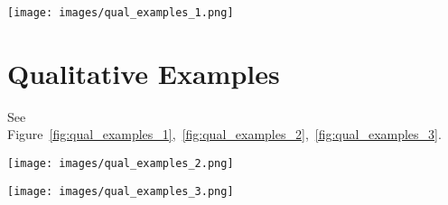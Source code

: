 \documentclass[11pt]{article}
\begin{document}
\begin{figure*}[!t]
\centering
    \texttt{[image: images/qual\_examples\_1.png]}
    \captionsetup{justification=centering}
    \caption[model]{Qualitative Examples Using Different Sampling Strategies.}
    \label{fig:qual_examples_1}
\end{figure*}


\newpage

\section{Qualitative Examples}

See Figure~\ref{fig:qual_examples_1},~\ref{fig:qual_examples_2},~\ref{fig:qual_examples_3}.
\begin{figure*}[!t]
\centering
    \texttt{[image: images/qual\_examples\_2.png]}
\caption[model]{Qualitative Examples Using Different Query Prompts. (Yellow bounding box is the goal's prediction, blue bounding box denotes the method's prediction, red bounding box denotes the step's prediction, green checkmark represents the ground truth.)}
    \label{fig:qual_examples_2}
\end{figure*}

\begin{figure*}[!t]
\centering
    \texttt{[image: images/qual\_examples\_3.png]}
\caption[model]{Qualitative Examples of Transfer Learning on Howto100m. 
    (The first row shows the multiple-choice examples of Howto100m video frames, the yellow bounding box is the prediction of the model without pre-training on wikiHow, blue bounding box denotes the prediction of the pre-trained model, and green checkmark represents the ground truth. The second row shows the related images and descriptions we found in wikiHow.)}
    \label{fig:qual_examples_3}
\end{figure*}
\end{document}
